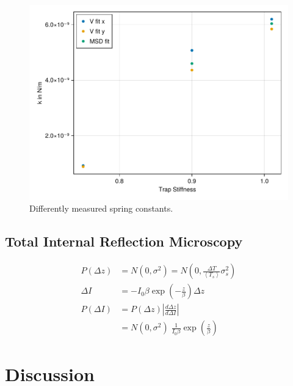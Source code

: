 \documentclass[
    parskip=half, 
    twoside=false,
    twocolumn=true,
    fontsize=11pt,
]{scrarticle}
\begin{document}
\begin{figure}[h]
    \centering
    \includegraphics{figures/01_03_4_spring_constants.pdf}
    \caption{Differently measured spring constants.}
\end{figure}

\clearpage
\subsection{Total Internal Reflection Microscopy}
\begin{align}
    P(\Delta z) &= N(0, \sigma^2) = N\left(0, \frac{\Delta T}{\left<T_s\right>} \sigma_s^2\right)\\
    \Delta I &= - I_0 \beta \exp\left(-\frac{z}{\beta}\right) \Delta z \\
    P(\Delta I) &= P(\Delta z) \left|\frac{d \Delta z}{d \Delta I}\right|\\
    &= N(0, \sigma^2) \;\frac{1}{I_0\beta} \exp\left(\frac{z}{\beta}\right)
\end{align}

\clearpage
\section{Discussion}
\end{document}
